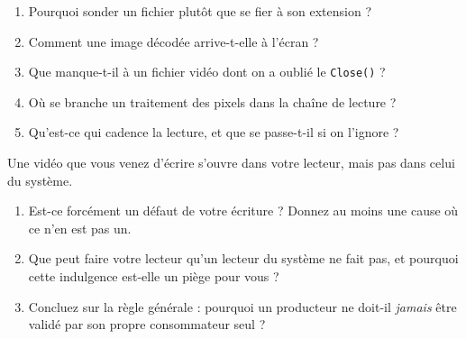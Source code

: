\begin{nkquestions}
\begin{enumerate}
\item Pourquoi sonder un fichier plutôt que se fier à son extension ?
\item Comment une image décodée arrive-t-elle à l'écran ?
\item Que manque-t-il à un fichier vidéo dont on a oublié le \texttt{Close()} ?
\item Où se branche un traitement des pixels dans la chaîne de lecture ?
\item Qu'est-ce qui cadence la lecture, et que se passe-t-il si on l'ignore ?
\end{enumerate}
\end{nkquestions}

\begin{nklogique}
Une vidéo que vous venez d'écrire s'ouvre dans votre lecteur, mais pas dans celui
du système.

\begin{enumerate}
\item Est-ce forcément un défaut de votre écriture ? Donnez au moins une cause
      où ce n'en est pas un.
\item Que peut faire votre lecteur qu'un lecteur du système ne fait pas, et
      pourquoi cette indulgence est-elle un piège pour vous ?
\item Concluez sur la règle générale : pourquoi un producteur ne doit-il
      \emph{jamais} être validé par son propre consommateur seul ?
\end{enumerate}
\end{nklogique}
